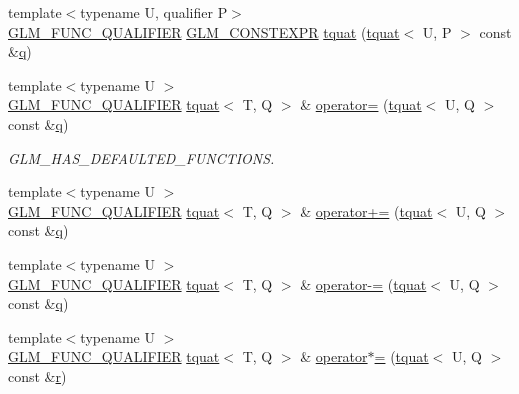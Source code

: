\begin{DoxyCompactItemize}
{\footnotesize template$<$typename U, qualifier P$>$ }\\\mbox{\hyperlink{setup_8hpp_a33fdea6f91c5f834105f7415e2a64407}{G\+L\+M\+\_\+\+F\+U\+N\+C\+\_\+\+Q\+U\+A\+L\+I\+F\+I\+ER}} \mbox{\hyperlink{setup_8hpp_a08b807947b47031d3a511f03f89645ad}{G\+L\+M\+\_\+\+C\+O\+N\+S\+T\+E\+X\+PR}} \mbox{\hyperlink{structglm_1_1tquat_a7646314c6d0f3d3f4df1e940e3181baa}{tquat}} (\mbox{\hyperlink{structglm_1_1tquat}{tquat}}$<$ U, P $>$ const \&\mbox{\hyperlink{_s_d_l__opengl_8h_a8fc1e7b9baaae687804c7eed46ca09c6}{q}})
\item 
{\footnotesize template$<$typename U $>$ }\\\mbox{\hyperlink{setup_8hpp_a33fdea6f91c5f834105f7415e2a64407}{G\+L\+M\+\_\+\+F\+U\+N\+C\+\_\+\+Q\+U\+A\+L\+I\+F\+I\+ER}} \mbox{\hyperlink{structglm_1_1tquat}{tquat}}$<$ T, Q $>$ \& \mbox{\hyperlink{structglm_1_1tquat_abbfc6f4a48d94487207b0aef77a2809c}{operator=}} (\mbox{\hyperlink{structglm_1_1tquat}{tquat}}$<$ U, Q $>$ const \&\mbox{\hyperlink{_s_d_l__opengl_8h_a8fc1e7b9baaae687804c7eed46ca09c6}{q}})
\begin{DoxyCompactList}\small\item\em G\+L\+M\+\_\+\+H\+A\+S\+\_\+\+D\+E\+F\+A\+U\+L\+T\+E\+D\+\_\+\+F\+U\+N\+C\+T\+I\+O\+NS. \end{DoxyCompactList}\item 
{\footnotesize template$<$typename U $>$ }\\\mbox{\hyperlink{setup_8hpp_a33fdea6f91c5f834105f7415e2a64407}{G\+L\+M\+\_\+\+F\+U\+N\+C\+\_\+\+Q\+U\+A\+L\+I\+F\+I\+ER}} \mbox{\hyperlink{structglm_1_1tquat}{tquat}}$<$ T, Q $>$ \& \mbox{\hyperlink{structglm_1_1tquat_afe4fd15b1ec1080a813466f1ab3509c5}{operator+=}} (\mbox{\hyperlink{structglm_1_1tquat}{tquat}}$<$ U, Q $>$ const \&\mbox{\hyperlink{_s_d_l__opengl_8h_a8fc1e7b9baaae687804c7eed46ca09c6}{q}})
\item 
{\footnotesize template$<$typename U $>$ }\\\mbox{\hyperlink{setup_8hpp_a33fdea6f91c5f834105f7415e2a64407}{G\+L\+M\+\_\+\+F\+U\+N\+C\+\_\+\+Q\+U\+A\+L\+I\+F\+I\+ER}} \mbox{\hyperlink{structglm_1_1tquat}{tquat}}$<$ T, Q $>$ \& \mbox{\hyperlink{structglm_1_1tquat_a4b913cb3c700dfbe26207223690ac255}{operator-\/=}} (\mbox{\hyperlink{structglm_1_1tquat}{tquat}}$<$ U, Q $>$ const \&\mbox{\hyperlink{_s_d_l__opengl_8h_a8fc1e7b9baaae687804c7eed46ca09c6}{q}})
\item 
{\footnotesize template$<$typename U $>$ }\\\mbox{\hyperlink{setup_8hpp_a33fdea6f91c5f834105f7415e2a64407}{G\+L\+M\+\_\+\+F\+U\+N\+C\+\_\+\+Q\+U\+A\+L\+I\+F\+I\+ER}} \mbox{\hyperlink{structglm_1_1tquat}{tquat}}$<$ T, Q $>$ \& \mbox{\hyperlink{structglm_1_1tquat_a7cfc09d64f373aba2b65cb58691f1607}{operator$\ast$=}} (\mbox{\hyperlink{structglm_1_1tquat}{tquat}}$<$ U, Q $>$ const \&\mbox{\hyperlink{_s_d_l__opengl_8h_a42ce7cdc612e53abee15043f80220d97}{r}})

\end{DoxyCompactItemize}
